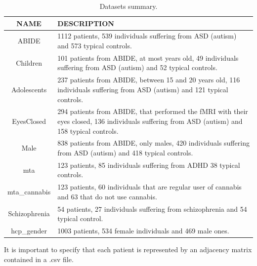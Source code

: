\begin{table}[htbp]
	\centering
	\begin{tabular}{cp{}}
		\toprule
		\textbf{NAME}          & \textbf{DESCRIPTION}                                                                                                                                     \\ 
		\midrule
		ABIDE         & 1112 patients, 539 individuals suffering from ASD (autism) and 573 typical controls.                                \\                            
		\midrule
		Children      & 101 patients from ABIDE, at most years old, 49 individuals suffering from ASD (autism) and 52 typical controls.                                 \\ 
		\midrule
		Adolescents   & 237 patients from ABIDE, between 15 and 20 years old, 116 individuals suffering from ASD (autism) and 121 typical controls.                     \\ 
		\midrule
		EyesClosed    & 294 patients from ABIDE, that performed the fMRI with their eyes closed, 136 individuals suffering from ASD (autism) and 158 typical controls.  \\ 
		\midrule
		Male          & 838 patients from ABIDE, only males, 420 individuals suffering from ASD (autism) and 418 typical controls.                                      \\ 
		\midrule
		mta           & 123 patients, 85 individuals suffering from ADHD 38 typical controls.                                                                           \\ 
		\midrule
		mta\_cannabis & 123 patients, 60 individuals that are regular user of cannabis and 63 that do not use cannabis.                                                 \\ 
		\midrule
		Schizophrenia & 54 patients, 27 individuals suffering from schizophrenia and 54 typical control.                                                                \\ 
		\midrule
		hcp\_gender   & 1003 patients, 534 female individuals and 469 male ones.                                                                                        \\
		\bottomrule
\end{tabular}
\caption{Datasets summary.}
\label{tab:datasets}
\end{table}

It is important to specify that each patient is represented by an adjacency matrix contained in a .csv file.

